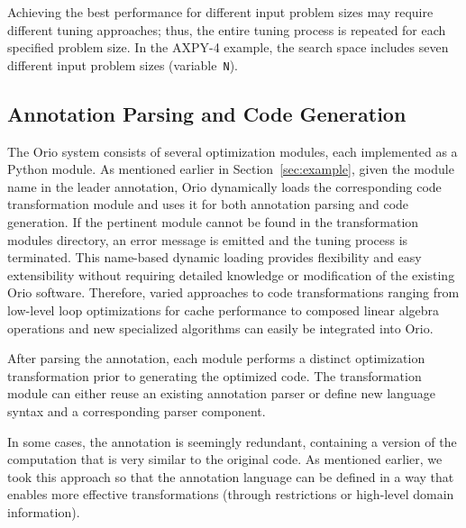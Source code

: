 Achieving the best performance for different input problem sizes may require
different tuning approaches; thus, the entire tuning process is
repeated for each specified problem size. In the AXPY-4 example, the search
space includes seven different input problem sizes (variable~\texttt{N}). 

\subsection{Annotation Parsing and Code Generation}

The Orio system consists of several optimization modules, each implemented as
a Python module. As mentioned earlier in Section~\ref{sec:example}, given the
module name in the leader annotation, Orio dynamically loads the
corresponding code transformation module and uses it for both annotation
parsing and code generation. If the pertinent module cannot be found in the
transformation modules directory, an error message is emitted and the tuning
process is terminated. This name-based dynamic loading provides flexibility
and easy extensibility without requiring detailed knowledge or modification
of the existing Orio software. Therefore, varied approaches to code
transformations ranging from low-level loop optimizations for cache
performance to composed linear algebra operations and new specialized
algorithms can easily be integrated into Orio.

After parsing the annotation, each module performs a distinct optimization
transformation prior to generating the optimized code.  The transformation
module can either reuse an existing annotation parser or define new language
syntax and a corresponding parser component. 

In some cases, the annotation is seemingly redundant, containing a version of
the computation that is very similar to the original code.  As mentioned
earlier, we took this approach so that the annotation language can be defined
in a way that enables more effective transformations (through restrictions or
high-level domain information).

